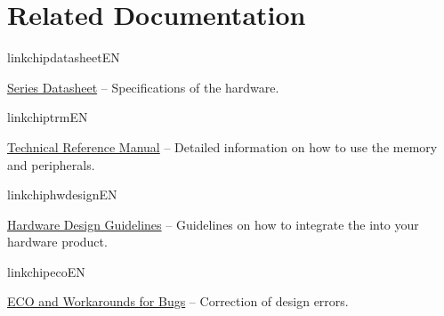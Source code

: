 
{%


\vspace{-0.5em}
\begin{minipage}{\textwidth}

\section*{Related Documentation}

\begin{itemize}
  \ifcsname linkchipdatasheetEN\endcsname%
    {%
      \item \href{\linkprefix\linkchipdatasheetEN}{\chipseries{} Series Datasheet} --
        {\small Specifications of the \chipseries{} hardware.}%
    }%
  \fi%

  \ifcsname linkchiptrmEN\endcsname%
    {%
      \item \href{\linkprefix\linkchiptrmEN}{\chipseries{} Technical Reference Manual} --
        {\small Detailed information on how to use the \chipseries{} memory and peripherals.}%
    }%
  \fi%

  \ifcsname linkchiphwdesignEN\endcsname%
    {%
      \item \href{\linkprefix\linkchiphwdesignEN}{\chipseries{} Hardware Design Guidelines} --
        {\small Guidelines on how to integrate the \chipseries{} into your hardware product.}%
    }%
  \fi%

  \ifcsname linkchipecoEN\endcsname%
    \item \href{\linkprefix\linkchipecoEN}{\chipseries{} ECO and Workarounds for Bugs} --
        {\small Correction of \chipseries{} design errors.}
  \fi%
  

\end{itemize}
\end{minipage}}
